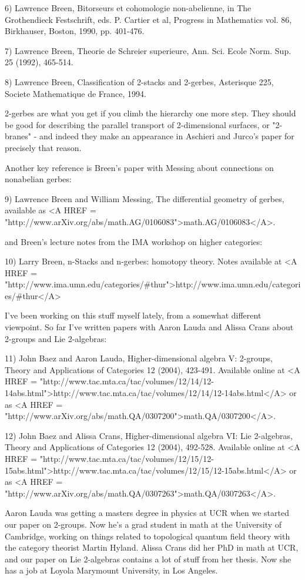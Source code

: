 6) Lawrence Breen, Bitorseurs et cohomologie non-abelienne,
in The Grothendieck Festschrift, eds. P. Cartier et al, Progress 
in Mathematics vol. 86, Birkhauser, Boston, 1990, pp. 401-476.

7) Lawrence Breen, Theorie de Schreier superieure, Ann. Sci. Ecole Norm.
Sup. 25 (1992), 465-514.

8) Lawrence Breen, Classification of 2-stacks and 2-gerbes, Asterisque
225, Societe Mathematique de France, 1994.

2-gerbes are what you get if you climb the hierarchy one more step.
They should be good for describing the parallel transport of 
2-dimensional surfaces, or "2-branes" - and indeed they make an 
appearance in Aschieri and Jurco's paper for precisely that reason.

Another key reference is Breen's paper with Messing about connections 
on nonabelian gerbes:

9) Lawrence Breen and William Messing, The differential geometry of gerbes,
available as <A HREF = "http://www.arXiv.org/abs/math.AG/0106083">math.AG/0106083</A>.

and Breen's lecture notes from the IMA workshop on higher categories:

10) Larry Breen, n-Stacks and n-gerbes: homotopy theory.
Notes available at <A HREF = "http://www.ima.umn.edu/categories/#thur">http://www.ima.umn.edu/categories/#thur</A>

I've been working on this stuff myself lately, from a somewhat different
viewpoint.  So far I've written papers with Aaron Lauda and Alissa Crans 
about 2-groups and Lie 2-algebras:

11) John Baez and Aaron Lauda, Higher-dimensional algebra V: 2-groups,
Theory and Applications of Categories 12 (2004), 423-491.  Available
online at <A HREF =
"http://www.tac.mta.ca/tac/volumes/12/14/12-14abs.html">http://www.tac.mta.ca/tac/volumes/12/14/12-14abs.html</A>
or as <A HREF =
"http://www.arXiv.org/abs/math.QA/0307200">math.QA/0307200</A>.

12) John Baez and Alissa Crans, Higher-dimensional algebra VI: Lie
2-algebras, Theory and Applications of Categories 12 (2004), 492-528.
Available online at <A HREF =
"http://www.tac.mta.ca/tac/volumes/12/15/12-15abs.html">http://www.tac.mta.ca/tac/volumes/12/15/12-15abs.html</A>
or as <A HREF =
"http://www.arXiv.org/abs/math.QA/0307263">math.QA/0307263</A>.

Aaron Lauda was getting a masters degree in physics at UCR when we started 
our paper on 2-groups.  Now he's a grad student in math at the University of
Cambridge, working on things related to topological quantum field theory 
with the category theorist Martin Hyland.  Alissa Crans did her PhD in math
at UCR, and our paper on Lie 2-algebras contains a lot of stuff from her 
thesis.  Now she has a job at Loyola Marymount University, in Los Angeles.  

